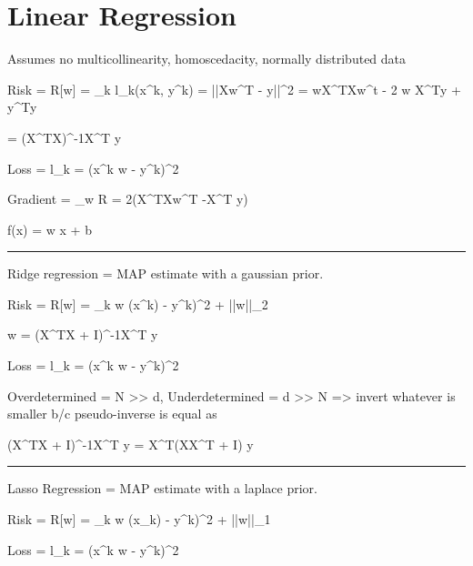 \documentclass[a4paper,twoside,twocolumn]{article}
\begin{document}
\section*{Linear Regression}
\label{sec-2}
\setlength{\parindent}{0pt}
{\scriptsize
Assumes no multicollinearity, homoscedacity, normally distributed data

Risk = R[w] = \Sigma_k l_k(x^k, y^k) = ||Xw^T - y||^2 = wX^TXw^t - 2 w X^Ty + y^Ty

 = (X^TX)^{-1}X^T y

Loss = l_k = (x^k w - y^k)^2

Gradient = \nabla_w R = 2(X^TXw^T -X^T y)

f(x) = w \cdot x + b

\noindent\rule{8cm}{0.4pt}

Ridge regression = MAP estimate with a gaussian prior.

Risk = R[w] = \Sigma_k w \phi(x^k) - y^k)^2 + \lambda ||w||_2

w = (X^TX + \lambda I)^{-1}X^T y

Loss = l_k = (x^k w - y^k)^2

Overdetermined = N >> d, Underdetermined = d >> N => invert whatever is smaller b/c pseudo-inverse is equal as \lambda {}

(X^TX + \lambda I)^{-1}X^T y = X^T(XX^T + \lambda I) y

\noindent\rule{8cm}{0.4pt}

Lasso Regression = MAP estimate with a laplace prior.

Risk = R[w] = \Sigma_k w \phi(x_k) - y^k)^2 + \lambda ||w||_1

Loss = l_k = (x^k w - y^k)^2

}
\end{document}
